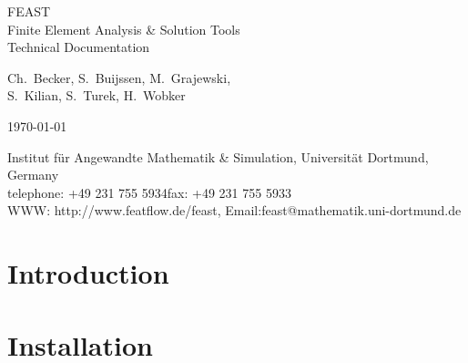 \documentclass[10pt,a4paper]{report}
\begin{document}
\begin{titlepage}

\vspace*{4cm}

\begin{center}

{\Huge FEAST}\\[2cm] 
{\huge Finite Element Analysis \& Solution Tools}\\[0.5cm] 

{\LARGE Technical Documentation}\\[3cm]

\vspace*{0.5cm}

{\large
 Ch.~Becker, S.~Buijssen, M.~Grajewski,\\[1em]
 S.~Kilian, S.~Turek, H.~Wobker}

\vspace*{2cm}

\today

\vspace*{2cm}

Institut f{\"u}r Angewandte Mathematik \& Simulation, Universit{\"a}t Dortmund, Germany \\[0.5em]
telephone: +49 231 755 5934\qquad fax: +49 231 755 5933 \\[0.5em]
WWW: http://www.featflow.de/feast, Email:feast@mathematik.uni-dortmund.de

\end{center}

\end{titlepage}


\tableofcontents


\chapter{Introduction}





\chapter{Installation}





\end{document}
